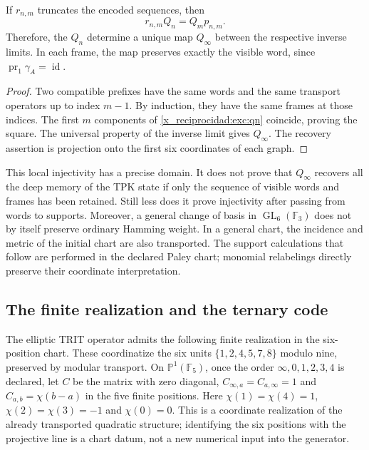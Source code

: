 \begin{proposition}
\label{x_reciprocidad:exc:limite-inverso}
If $r_{n,m}$ truncates the encoded sequences, then
\[
 r_{n,m}Q_n=Q_m p_{n,m}.
\]
Therefore, the $Q_n$ determine a unique map $Q_\infty$ between the
respective inverse limits. In each frame, the map preserves exactly
the visible word, since $\operatorname{pr}_1\gamma_A=\operatorname{id}$.
\end{proposition}

\begin{proof}
Two compatible prefixes have the same words and the same
transport operators up to index $m-1$. By induction, they have
the same frames at those indices. The first $m$ components of
\eqref{x_reciprocidad:exc:qn} coincide, proving the square. The universal
property of the inverse limit gives $Q_\infty$. The recovery assertion
is projection onto the first six coordinates of each graph.
\end{proof}

This local injectivity has a precise domain. It does not prove that
$Q_\infty$ recovers all the deep memory of the TPK state if only the
sequence of visible words and frames has been retained. Still less does it
prove injectivity after passing from words to supports.
Moreover, a general change of basis in $\operatorname{GL}_6(\mathbb F_3)$
does not by itself preserve ordinary Hamming weight. In a general
chart, the incidence and metric of the initial chart are also
transported. The support calculations that follow are performed in the declared
Paley chart; monomial relabelings directly preserve their
coordinate interpretation.

\subsection{The finite realization and the ternary code}
\label{x_reciprocidad:exc:paley-codigo}

The elliptic TRIT operator admits the following finite realization in
the six-position chart. These coordinatize the six units
$\{1,2,4,5,7,8\}$ modulo nine, preserved by modular transport.
On $\mathbb P^1(\mathbb F_5)$, once
the order $\infty,0,1,2,3,4$ is declared, let $C$ be the matrix with zero
diagonal, $C_{\infty,a}=C_{a,\infty}=1$ and
$C_{a,b}=\chi(b-a)$ in the five finite positions. Here
$\chi(1)=\chi(4)=1$, $\chi(2)=\chi(3)=-1$ and $\chi(0)=0$.
This is a coordinate realization of the already transported quadratic
structure; identifying the six positions with the projective
line is a chart datum, not a new numerical input into the
generator.

